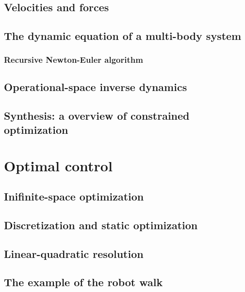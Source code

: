 \documentclass{book}
\begin{document}
\chapter{Velocities and forces}

\chapter{The dynamic equation of a multi-body system}

\section{Recursive Newton-Euler algorithm}

\chapter{Operational-space inverse dynamics}

\chapter{Synthesis: a overview of constrained optimization}

\part{Optimal control}

\chapter{Inifinite-space optimization}

\chapter{Discretization and static optimization}

\chapter{Linear-quadratic resolution}

\chapter{The example of the robot walk}
\end{document}
